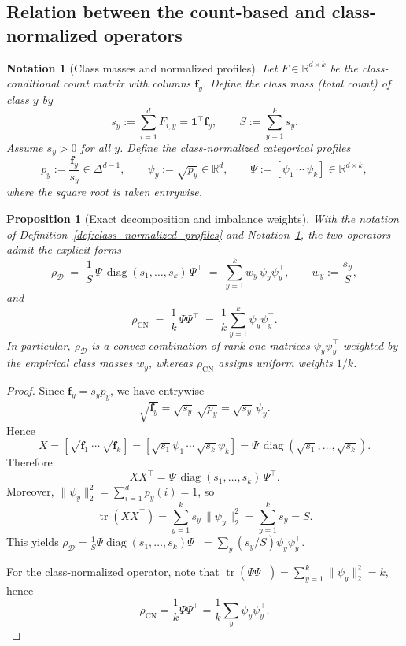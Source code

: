 \documentclass[preprint,11pt]{elsarticle}
\newtheorem{Notation}[Theorem]{Notation}
\newtheorem{Proposition}[Theorem]{Proposition}
\newcommand{\tr}{\operatorname{tr}}
\newcommand{\R}{\mathbb{R}}
\newcommand{\diag}{\operatorname{diag}}
\begin{document}
\subsection{Relation between the count-based and class-normalized operators}
\label{subsec:relation_two_operators}

\begin{Notation}[Class masses and normalized profiles]
\label{not:class_masses_profiles}
Let $F\in\R^{d\times k}$ be the class-conditional count matrix with columns $\mathbf f_y$.
Define the class mass (total count) of class $y$ by
\[
s_y := \sum_{i=1}^d F_{i,y} = \mathbf 1^\top \mathbf f_y,
\qquad
S := \sum_{y=1}^k s_y.
\]
Assume $s_y>0$ for all $y$.
Define the class-normalized categorical profiles
\[
p_y := \frac{\mathbf f_y}{s_y}\in\Delta^{d-1},
\qquad
\psi_y := \sqrt{p_y}\in\R^d,
\qquad
\Psi := [\psi_1\,\cdots\,\psi_k]\in\R^{d\times k},
\]
where the square root is taken entrywise.
\end{Notation}

\begin{Proposition}[Exact decomposition and imbalance weights]
\label{prop:exact_relation_rho_hat_rho}
With the notation of Definition~\ref{def:class_normalized_profiles} and Notation~\ref{not:class_masses_profiles}, the two operators admit the explicit forms
\[
\rho_{\mathcal D} \;=\; \frac{1}{S}\,\Psi\,\diag(s_1,\dots,s_k)\,\Psi^\top
\;=\;
\sum_{y=1}^k w_y\,\psi_y\psi_y^\top,
\qquad
w_y := \frac{s_y}{S},
\]
and
\[
\rho_{\mathrm{CN}} \;=\; \frac{1}{k}\,\Psi\Psi^\top
\;=\;
\frac{1}{k}\sum_{y=1}^k \psi_y\psi_y^\top.
\]
In particular, $\rho_{\mathcal D}$ is a convex combination of rank-one matrices $\psi_y\psi_y^\top$ weighted by the
empirical class masses $w_y$, whereas $\rho_{\mathrm{CN}}$ assigns uniform weights $1/k$.
\end{Proposition}

\begin{proof}
Since $\mathbf f_y = s_y p_y$, we have entrywise
\[
\sqrt{\mathbf f_y} = \sqrt{s_y}\,\sqrt{p_y} = \sqrt{s_y}\,\psi_y.
\]
Hence
\[
X = [\sqrt{\mathbf f_1}\,\cdots\,\sqrt{\mathbf f_k}]
   = [\sqrt{s_1}\psi_1\,\cdots\,\sqrt{s_k}\psi_k]
   = \Psi\,\diag(\sqrt{s_1},\dots,\sqrt{s_k}).
\]
Therefore
\[
XX^\top = \Psi\,\diag(s_1,\dots,s_k)\,\Psi^\top.
\]
Moreover, $\|\psi_y\|_2^2=\sum_{i=1}^d p_y(i)=1$, so
\[
\tr(XX^\top)=\sum_{y=1}^k s_y\,\|\psi_y\|_2^2=\sum_{y=1}^k s_y = S.
\]
This yields $\rho_{\mathcal D}=\frac{1}{S}\Psi\diag(s_1,\dots,s_k)\Psi^\top=\sum_y (s_y/S)\psi_y\psi_y^\top$.

For the class-normalized operator, note that $\tr(\Psi\Psi^\top)=\sum_{y=1}^k\|\psi_y\|_2^2=k$, hence
\[
\rho_{\mathrm{CN}} = \frac{1}{k}\Psi\Psi^\top = \frac{1}{k}\sum_y \psi_y\psi_y^\top.
\]
\end{proof}
\end{document}
